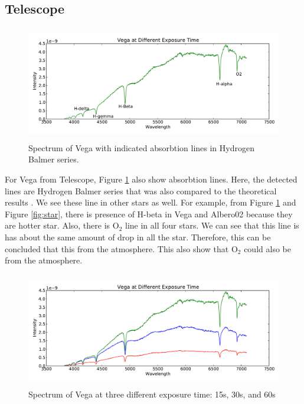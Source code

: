 \documentclass[a4paper,12pt]{article}
\begin{document}
\subsection{Telescope} 
\label{sec:telescope}

\begin{figure}[H]
\centering
\includegraphics[angle=0,height=5cm,width=12cm]{graphs/Vegaline.pdf}
\caption{Spectrum of Vega with indicated absorbtion lines in Hydrogen Balmer series.}
\label{fig:vega}
\end{figure}
For Vega from Telescope, Figure \ref{fig:vega} also show absorbtion lines. Here, the detected lines are Hydrogen Balmer series that was also compared to the theoretical results \cite{theo}. We see these line in other stars as well. For example, from Figure \ref{fig:vega} and Figure \ref{fig:star}, there is presence of H-beta in Vega and Albero02 because they are hotter star. Also, there is O$_2$ line in all four stars. We can see that this line is has about the same amount of drop in all the star. Therefore, this can be concluded that this from the atmosphere. This also show that O$_2$ could also be from the atmosphere. 
\begin{figure}[H]
\centering
\includegraphics[angle=0,height=5cm,width=12cm]{graphs/Vega.pdf}
\caption{Spectrum of Vega at three different exposure time: 15s, 30s, and 60s}
\label{fig:vegaall}
\end{figure}
\end{document}
